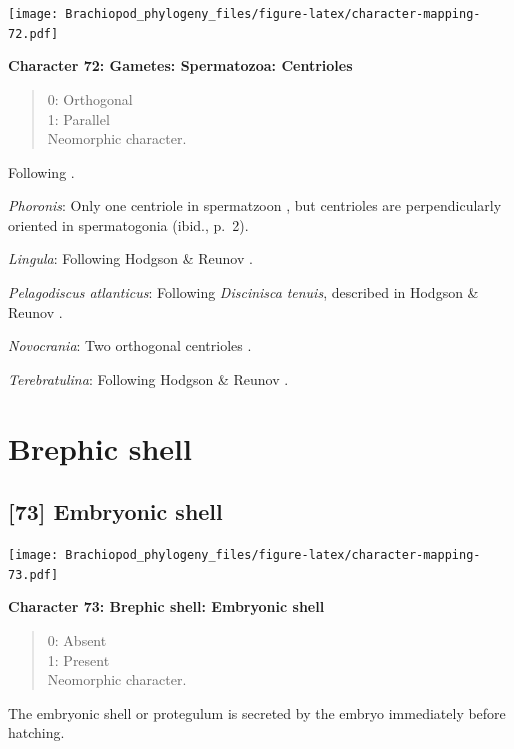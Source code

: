 \documentclass[]{book}
\theoremstyle{definition}
\theoremstyle{definition}
\theoremstyle{definition}
\theoremstyle{remark}
\begin{document}
\texttt{[image: Brachiopod\_phylogeny\_files/figure-latex/character-mapping-72.pdf]}

\textbf{Character 72: Gametes: Spermatozoa: Centrioles}

\begin{quote}
0: Orthogonal\\
1: Parallel\\
Neomorphic character.
\end{quote}

Following \citet{Hodgson1994Ultrastructureof}.

\emph{Phoronis}: Only one centriole in spermatzoon
\citep[p.~7]{Reunov2004Ultrastructuralstudy}, but centrioles are
perpendicularly oriented in spermatogonia (ibid., p.~2).

\emph{Lingula}: Following Hodgson \& Reunov
\citeyearpar{Hodgson1994Ultrastructureof}.

\emph{Pelagodiscus atlanticus}: Following \emph{Discinisca}
\emph{tenuis}, described in Hodgson \& Reunov
\citeyearpar{Hodgson1994Ultrastructureof}.

\emph{Novocrania}: Two orthogonal centrioles
\citep{Afzelius1978Finestructure}.

\emph{Terebratulina}: Following Hodgson \& Reunov
\citeyearpar{Hodgson1994Ultrastructureof}.

\hypertarget{brephic-shell}{%
\section{Brephic shell}\label{brephic-shell}}

\hypertarget{embryonic-shell}{%
\subsection*{{[}73{]} Embryonic shell}\label{embryonic-shell}}

\texttt{[image: Brachiopod\_phylogeny\_files/figure-latex/character-mapping-73.pdf]}

\textbf{Character 73: Brephic shell: Embryonic shell}

\begin{quote}
0: Absent\\
1: Present\\
Neomorphic character.
\end{quote}

The embryonic shell or protegulum is secreted by the embryo immediately
before hatching.
\end{document}
